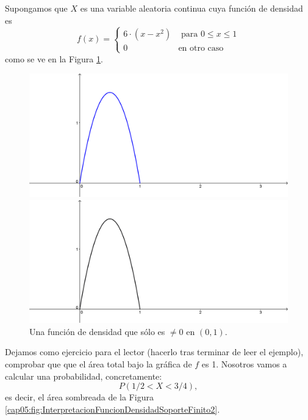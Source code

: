 \begin{ejemplo}
\label{cap05:ejem:FuncionDensidadSoporteFinito}
    Supongamos que $X$ es una variable aleatoria continua cuya función de densidad es
    \[f(x)=\begin{cases}6\cdot(x-x^2)&\mbox{ para }0\leq x\leq 1\\ 0&\mbox{en otro caso}\end{cases}\]
    como se ve en la Figura \ref{cap05:fig:InterpretacionFuncionDensidadSoporteFinito}.

\begin{figure}[htbp]
\begin{center}
\begin{enColor}
\includegraphics[width=12cm]{../fig/Cap05-InterpretacionFuncionDensidadSoporteFinito.png}
\end{enColor}
\begin{bn}
\includegraphics[width=12cm]{../fig/Cap05-InterpretacionFuncionDensidadSoporteFinito-bn.png}
\end{bn}
\caption{Una función de densidad que sólo es $\neq 0$ en $(0,1)$.}
\label{cap05:fig:InterpretacionFuncionDensidadSoporteFinito}
\end{center}
\end{figure}

    Dejamos como ejercicio para el lector (hacerlo tras terminar de leer el ejemplo), comprobar que  que el área total bajo la gráfica de $f$ es 1.  Nosotros vamos a calcular una probabilidad, concretamente:
    \[P(1/2<X<3/4),\]
    es decir, el área sombreada de la Figura \ref{cap05:fig:InterpretacionFuncionDensidadSoporteFinito2}.


\end{ejemplo}
